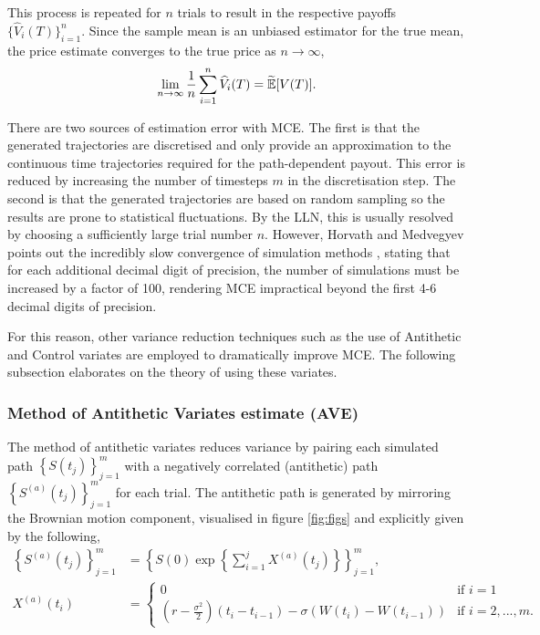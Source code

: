 This process is repeated for $n$ trials to result in the respective payoffs $\{\widehat{V}_i(T)\}_{i=1}^n$. Since the sample mean is an unbiased estimator for the true mean, the price estimate converges to the true price as $n \to \infty$,
$$
\lim_{n \to \infty} \frac{1}{n}\sum_{i=1}^n\widehat{V}_i(T) = \widetilde{\mathbb{E}}[V(T)].
$$

There are two sources of estimation error with MCE. The first is that the generated trajectories are discretised and only provide an approximation to the continuous time trajectories required for the path-dependent payout. This error is reduced by increasing the number of timesteps $m$ in the discretisation step. The second is that the generated trajectories are based on random sampling so the results are prone to statistical fluctuations. By the LLN, this is usually resolved by choosing a sufficiently large trial number $n$. However, Horvath and Medvegyev points out the incredibly slow convergence of simulation methods \cite{nummethods}, stating that for each additional decimal digit of precision, the number of simulations must be increased by a factor of 100, rendering MCE impractical beyond the first 4-6 decimal digits of precision.

For this reason, other variance reduction techniques such as the use of Antithetic and Control variates are employed to dramatically improve MCE. The following subsection elaborates on the theory of using these variates.

\subsubsection{Method of Antithetic Variates estimate (AVE)}
The method of antithetic variates reduces variance by pairing each simulated path \(\left\{S(t_j)\right\}_{j=1}^{m}\) with a negatively correlated (antithetic) path \(\left\{S^{(a)}(t_j)\right\}_{j=1}^{m}\) for each trial. The antithetic path is generated by mirroring the Brownian motion component, visualised in figure \ref{fig:figs} and explicitly given by the following,
\begin{align*}
\left\{S^{(a)}(t_j)\right\}_{j=1}^{m} &= \left\{S(0)\exp\left\{\sum_{i=1}^jX^{(a)}(t_j)\right\}\right\}_{j=1}^{m},\\
X^{(a)}(t_i) &= \begin{cases}
    0 & \text{if } i = 1\\
    \left(r - \frac{\sigma^2}{2}\right)\left(t_{i}-t_{i-1}\right) - \sigma\left(W(t_i) - W(t_{i-1})\right) & \text{if } i = 2, ..., m.
\end{cases}
\end{align*}

